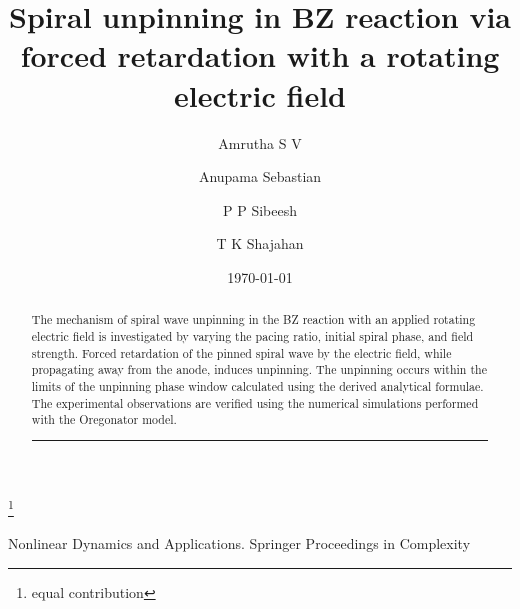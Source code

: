 \documentclass[%
 preprint,
 amsmath,amssymb,
 aps,
]{revtex4-2}
\begin{document}

\title{Spiral unpinning in BZ reaction via forced retardation with a rotating electric field }%


\author{Amrutha S V}
\thanks{equal contribution}%
\author{Anupama Sebastian}%

\author{P P Sibeesh}

\author{T K Shajahan}


\date{\today}%

\begin{abstract}
The mechanism of spiral wave unpinning in the BZ reaction with an applied rotating electric field is investigated by varying the pacing ratio, initial spiral phase, and field strength. Forced retardation of the pinned spiral wave by the electric field, while propagating away from the anode, induces unpinning. The unpinning occurs within the limits of the unpinning phase window calculated using the derived analytical formulae. The experimental observations are verified using the numerical simulations performed with the Oregonator model.
\vspace{5pt}
\hrule
\vspace{5pt} 
\end{abstract}Nonlinear Dynamics and Applications. Springer Proceedings in Complexity

                             
\maketitle


\end{document}

